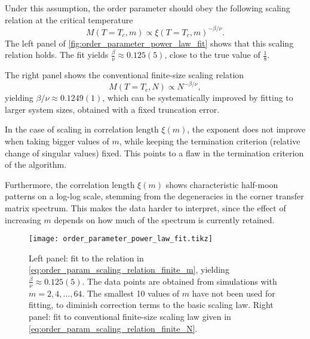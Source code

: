 Under this assumption, the order parameter should obey the following scaling relation at
the critical temperature
\begin{equation}\label{eq:order_param_scaling_relation_finite_m}
  M(T = T_c, m) \propto \xi(T = T_c, m)^{-\beta/\nu}.
\end{equation}
The left panel of \autoref{fig:order_parameter_power_law_fit} shows that this scaling
relation holds. The fit yields $\frac{\beta}{\nu} \approx 0.125(5)$, close to the true
value of $\frac{1}{8}$.

The right panel shows the conventional finite-size scaling relation
\begin{equation}\label{eq:order_param_scaling_relation_finite_N}
  M(T = T_c, N) \propto N^{-\beta/\nu},
\end{equation}
yielding $\beta/\nu \approx 0.1249(1)$, which can be systematically improved by
fitting to larger system sizes, obtained with a fixed truncation error.

In the case of scaling in correlation length $\xi(m)$, the exponent does not improve when
taking bigger values of $m$, while keeping the termination criterion (relative change of
singular values) fixed. This points to a flaw in the termination criterion of the
algorithm.

Furthermore, the correlation length $\xi(m)$ shows characteristic half-moon patterns on a
log-log scale, stemming from the degeneracies in the corner transfer matrix spectrum. This
makes the data harder to interpret, since the effect of increasing $m$ depends on how much
of the spectrum is currently retained.


\begin{figure}
  \texttt{[image: order\_parameter\_power\_law\_fit.tikz]}
  \caption{Left panel: fit to the relation in
  \autoref{eq:order_param_scaling_relation_finite_m}, yielding $\frac{\beta}{\nu} \approx
  0.125(5)$. The data points are obtained from simulations with $m = 2, 4, \dots, 64$. The
  smallest 10 values of $m$ have not been used for fitting, to diminish correction terms
  to the basic scaling law. Right panel: fit to conventional finite-size scaling law
  given in \autoref{eq:order_param_scaling_relation_finite_N}.
  }
  \label{fig:order_parameter_power_law_fit}
\end{figure}

